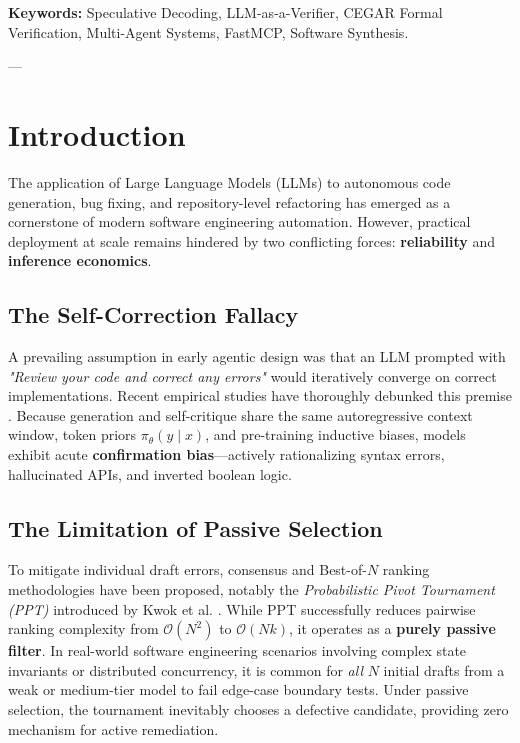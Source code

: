 \documentclass[10pt,twocolumn,letterpaper]{article}
\begin{document}
\textbf{Keywords:} Speculative Decoding, LLM-as-a-Verifier, CEGAR Formal Verification, Multi-Agent Systems, FastMCP, Software Synthesis.

---

\section{Introduction}

The application of Large Language Models (LLMs) to autonomous code generation, bug fixing, and repository-level refactoring has emerged as a cornerstone of modern software engineering automation. However, practical deployment at scale remains hindered by two conflicting forces: \textbf{reliability} and \textbf{inference economics}.

\subsection{The Self-Correction Fallacy}
A prevailing assumption in early agentic design was that an LLM prompted with \textit{"Review your code and correct any errors"} would iteratively converge on correct implementations. Recent empirical studies have thoroughly debunked this premise \cite{huang2023large,stechly2024self}. Because generation and self-critique share the same autoregressive context window, token priors $\pi_\theta(y \mid x)$, and pre-training inductive biases, models exhibit acute \textbf{confirmation bias}---actively rationalizing syntax errors, hallucinated APIs, and inverted boolean logic.

\subsection{The Limitation of Passive Selection}
To mitigate individual draft errors, consensus and Best-of-$N$ ranking methodologies have been proposed, notably the \textit{Probabilistic Pivot Tournament (PPT)} introduced by Kwok et al. \cite{kwok2026llm}. While PPT successfully reduces pairwise ranking complexity from $\mathcal{O}(N^2)$ to $\mathcal{O}(Nk)$, it operates as a \textbf{purely passive filter}. In real-world software engineering scenarios involving complex state invariants or distributed concurrency, it is common for \textit{all} $N$ initial drafts from a weak or medium-tier model to fail edge-case boundary tests. Under passive selection, the tournament inevitably chooses a defective candidate, providing zero mechanism for active remediation.
\end{document}

